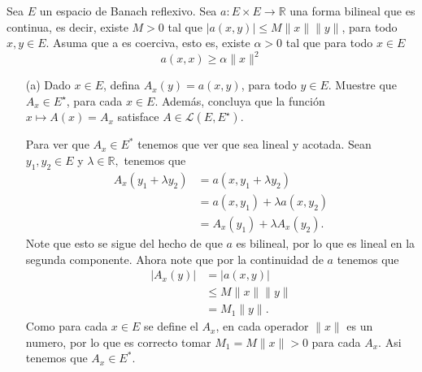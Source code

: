   Sea $E$ un espacio de Banach reflexivo. Sea  $a:E \times E \to \mathbb{R}$ una forma bilineal que es continua, es decir, existe $M>0$ tal que $|a(x, y)| \leq M\|x\|\|y\|$, para todo $x, y \in E$. Asuma que a es coerciva, esto es, existe $\alpha>0$ tal que para todo $x \in E$
$$
a(x, x) \geq \alpha\|x\|^2
$$
\begin{itemize}
    \item[(a)]Dado $x \in E$, defina $A_x(y)=a(x, y)$, para todo $y \in E$. Muestre que $A_x \in E^{\star}$, para cada $x \in E$. Además, concluya que la función $x \mapsto A(x)=A_x$ satisface $A \in \mathcal{L}\left(E, E^{\star}\right)$. 
    \begin{sproof}
      Para ver que $A_x\in E^*$ tenemos que ver que sea lineal y acotada. Sean $y_1,y_2\in E$ y $\lambda\in \mathbb{R},$ tenemos que
      \begin{align*}
        A_x(y_1+\lambda y_2)&=a(x,y_1+\lambda y_2)\\
        &=a(x,y_1)+\lambda a(x,y_2)\\
        &=A_x(y_1)+\lambda A_x(y_2).
      \end{align*}
      Note que esto se sigue del hecho de que $a$ es bilineal, por lo que es lineal en la segunda componente. Ahora note que por la continuidad de $a$ tenemos que
      \begin{align*}
        |A_x(y)|&=|a(x,y)|\\
        &\leq M\|x\|\|y\|\\
        &=M_1\|y\|.
      \end{align*}
      Como para cada $x\in E$ se define el $A_x$, en cada operador $\|x\|$ es un numero, por lo que es correcto tomar $M_1=M\|x\|>0$ para cada $A_x.$ Asi tenemos que $A_x\in E^*.$\\


\end{sproof}
\end{itemize}
